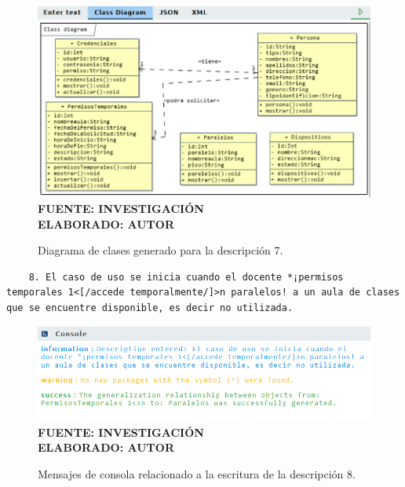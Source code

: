  \begin{figure}[H]
 	\centering
 	\caption{Diagrama de clases generado para la descripción 7.}
 	\includegraphics[width=15cm]{img/dc-eva-007.png}
 	\label{fig:dc_eva_007}
 	\vspace{4mm}
 	{\footnotesize \textbf{\\ FUENTE: INVESTIGACIÓN} \textbf{\\ ELABORADO: AUTOR}}
 \end{figure}
 
 \begin{lstlisting}
 	8. El caso de uso se inicia cuando el docente *¡permisos temporales 1<[/accede temporalmente/]>n paralelos! a un aula de clases que se encuentre disponible, es decir no utilizada.
 \end{lstlisting}

     \begin{figure}[h!]
     	\centering
	\caption{Mensajes de consola relacionado a la escritura de la descripción 8.}
	\includegraphics[width=14cm]{img/not-eva-008.png}
	\label{fig:not_eva_008}
	\vspace{4mm}
	{\footnotesize \textbf{\\ FUENTE: INVESTIGACIÓN} \textbf{\\ ELABORADO: AUTOR}}
\end{figure}

